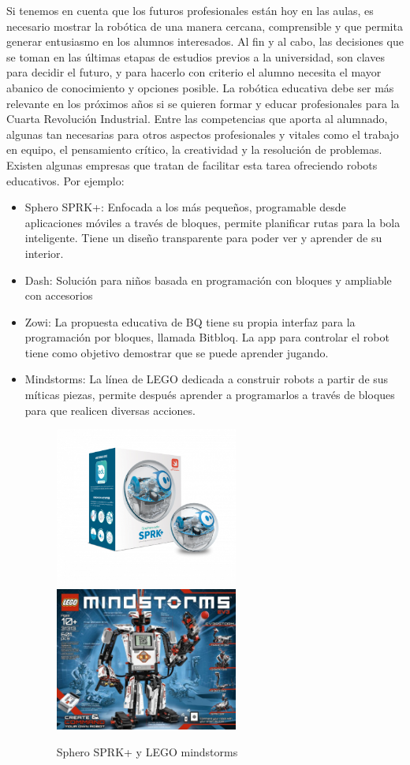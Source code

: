 \documentclass[12pt,spanish,chapterprefix, numbers=noenddot]{book}
\numberwithin{equation}{section}
\numberwithin{figure}{section}
\begin{document}
Si tenemos en cuenta que los futuros profesionales están hoy en las aulas, es necesario mostrar la robótica de una manera cercana, comprensible y que permita generar entusiasmo en los alumnos interesados. Al fin y al cabo, las decisiones que se toman en las últimas etapas de estudios previos a la universidad, son claves para decidir el futuro, y para hacerlo con criterio el alumno necesita el mayor abanico de conocimiento y opciones posible. 
La robótica educativa debe ser más relevante en los próximos años si se quieren formar y educar profesionales para la Cuarta Revolución Industrial. Entre las competencias que aporta al alumnado, algunas tan necesarias para otros aspectos profesionales y vitales como el trabajo en equipo, el pensamiento crítico, la creatividad y la resolución de problemas. Existen algunas empresas que tratan de facilitar esta tarea ofreciendo robots educativos. Por ejemplo: 
\begin{itemize}
    \item Sphero SPRK+: Enfocada a los más pequeños, programable desde aplicaciones móviles a través de bloques, permite planificar rutas para la bola inteligente. Tiene un diseño transparente para poder ver y aprender de su interior.  
    \item Dash: Solución para niños basada en programación con bloques y ampliable con accesorios 
    \item Zowi: La propuesta educativa de BQ tiene su propia interfaz para la programación por bloques, llamada Bitbloq. La app para controlar el robot tiene como objetivo demostrar que se puede aprender jugando.
    \item Mindstorms: La línea de LEGO dedicada a construir robots a partir de sus míticas piezas, permite después aprender a programarlos a través de bloques para que realicen diversas acciones. 
    \begin{figure}[h!]
    \centering
    \includegraphics[width=6cm]{Figs/spheroedu-sprkplus.png}
    \includegraphics[width=6cm]{Figs/mindstorms.jpg}
    \par
    \caption{\label{fig:sphero}Sphero SPRK+ y LEGO mindstorms}
    \end{figure}
\end{itemize}
\end{document}
